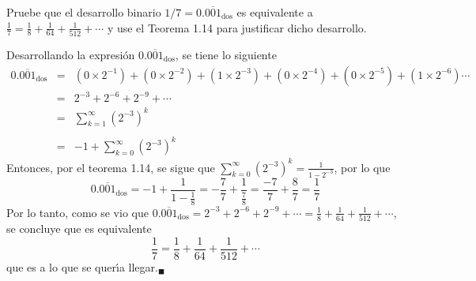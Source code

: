 \begin{enunciado}
 Pruebe que el desarrollo binario $1/7 = 0.\overline{001}_{\text{dos}}$ es equivalente a $\frac{1}{7} = \frac{1}{8} + \frac{1}{64} + \frac{1}{512} + \cdots$ y use el Teorema 1.14 para justificar dicho desarrollo.
\end{enunciado}

\begin{solucion}
 Desarrollando la expresi\'on $0.\overline{001}_{\text{dos}}$, se tiene lo siguiente
 \begin{eqnarray*}
  0.\overline{001}_{\text{dos}} & = & \left( 0\times 2^{-1} \right) + \left( 0\times 2^{-2} \right) + \left( 1\times 2^{-3} \right) + \left( 0\times 2^{-4} \right) + \left( 0\times 2^{-5} \right) + \left( 1\times 2^{-6} \right)  \cdots \\
  & = & 2^{-3} + 2^{-6} + 2^{-9} + \cdots \\
  & = & \displaystyle{ \sum_{k=1}^{\infty} \left( 2^{-3} \right)^k } \\
  \\
  & = & \displaystyle{ -1 + \sum_{k=0}^{\infty} \left( 2^{-3} \right)^k }
 \end{eqnarray*}
 Entonces, por el teorema 1.14, se sigue que $\displaystyle{ \sum_{k=0}^{\infty} \left( 2^{-3} \right)^k = \frac{1}{1 - 2^{-3}} }$, por lo que
 \begin{equation*}
  0.\overline{001}_{\text{dos}} = -1 + \frac{1}{1 - \frac{1}{8}} = -\frac{7}{7} + \frac{1}{\frac{7}{8}} = \frac{-7}{7} + \frac{8}{7} = \frac{1}{7}
 \end{equation*}
 Por lo tanto, como se vio que $0.\overline{001}_{\text{dos}} = 2^{-3} + 2^{-6} + 2^{-9} + \cdots = \frac{1}{8} + \frac{1}{64} + \frac{1}{512} + \cdots$, se concluye que es equivalente 
 \begin{equation*}
  \frac{1}{7} = \frac{1}{8} + \frac{1}{64} + \frac{1}{512} + \cdots
 \end{equation*}
 que es a lo que se quer\'{\i}a llegar.${}_{\blacksquare}$
\end{solucion}
